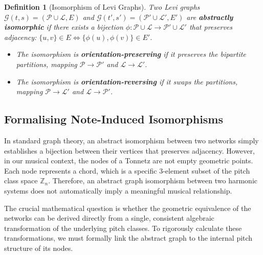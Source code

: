\documentclass[11pt,letterpaper]{amsart}
\newcommand{\Z}{\mathbb{Z}}
\newtheorem{definition}{Definition}
\begin{document}

\begin{definition}[Isomorphism of Levi Graphs]
Two Levi graphs $\mathcal{G}(t,s) = (\mathcal{P} \cup \mathcal{L}, E)$ and $\mathcal{G}(t',s') = (\mathcal{P}' \cup \mathcal{L}', E')$ are \textbf{abstractly isomorphic} if there exists a bijection $\phi: \mathcal{P} \cup \mathcal{L} \to \mathcal{P}' \cup \mathcal{L}'$ that preserves adjacency: $\{u,v\} \in E \iff \{\phi(u),\phi(v)\} \in E'$. 
\begin{itemize}
    \item The isomorphism is \textbf{orientation-preserving} if it preserves the bipartite partitions, mapping $\mathcal{P} \to \mathcal{P}'$ and $\mathcal{L} \to \mathcal{L}'$.
    \item The isomorphism is \textbf{orientation-reversing} if it swaps the partitions, mapping $\mathcal{P} \to \mathcal{L}'$ and $\mathcal{L} \to \mathcal{P}'$.
\end{itemize}
\end{definition}

\subsection{Formalising Note-Induced Isomorphisms}

In standard graph theory, an abstract isomorphism between two networks simply establishes a bijection between their vertices that preserves adjacency. However, in our musical context, the nodes of a Tonnetz are not empty geometric points. Each node represents a chord, which is a specific 3-element subset of the pitch class space $\Z_n$. Therefore, an abstract graph isomorphism between two harmonic systems does not automatically imply a meaningful musical relationship. 

The crucial mathematical question is whether the geometric equivalence of the networks can be derived directly from a single, consistent algebraic transformation of the underlying pitch classes. To rigorously calculate these transformations, we must formally link the abstract graph to the internal pitch structure of its nodes.
\end{document}
